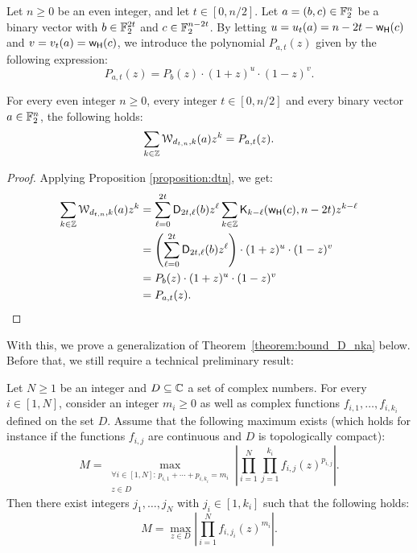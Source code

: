 \documentclass[11pt]{llncs}
\begin{document}
\begin{definition}\label{defi:P_a_t}
    Let $n\geq 0$ be an even integer, and let $t\in[0,n/2]$. Let $a=(b,c)\in\mathbb{F}_2^n$ be a binary vector with $b\in\mathbb{F}_2^{2t}$ and $c\in\mathbb{F}_2^{n-2t}$. By letting $u=u_t(a)=n-2t-\mathsf{w_H}(c)$ and $v=v_t(a)=\mathsf{w_H}(c)$, we introduce the polynomial $P_{a,t}(z)$ given by the following expression:
    \[
        P_{a,t}(z)=P_b(z)\cdot(1+z)^u\cdot(1-z)^v.
    \]
\end{definition}

\begin{proposition}
    For every even integer $n\geq 0$, every integer $t\in[0,n/2]$ and every binary vector $a\in\mathbb{F}_2^n$, the following holds:
    \[
        \sum_{k\in\mathbb{Z}}\mathcal{W}_{d_{t,n},k}(a)z^k=P_{a,t}(z).
    \]
\end{proposition}

\begin{proof}
    Applying Proposition \ref{proposition:dtn}, we get:
    \begin{align*}
        \sum_{k\in\mathbb{Z}}\mathcal{W}_{d_{t,n},k}(a)z^k&=\sum_{\ell=0}^{2t}\mathsf{D}_{2t,\ell}(b)z^\ell\sum_{k\in\mathbb{Z}}\mathsf{K}_{k-\ell}(\mathsf{w_H}(c),n-2t)z^{k-\ell}\\
        &=\left(\sum_{\ell=0}^{2t}\mathsf{D}_{2t,\ell}(b)z^\ell\right)\cdot(1+z)^u\cdot(1-z)^v\\
        &=P_b(z)\cdot(1+z)^u\cdot(1-z)^v\\
        &=P_{a,t}(z).\qedhere
    \end{align*}
\end{proof}

With this, we prove a generalization of Theorem~\ref{theorem:bound_D_nka} below. Before that, we still require a technical preliminary result:

\begin{lemma}\label{lemma:maximizing_args}
    Let $N\geq 1$ be an integer and $D\subseteq\mathbb{C}$ a set of complex numbers. For every $i\in[1,N]$, consider an integer $m_i\geq 0$ as well as complex functions $f_{i,1},\dots,f_{i,k_i}$ defined on the set $D$. Assume that the following maximum exists (which holds for instance if the functions $f_{i,j}$ are continuous and $D$ is topologically compact):
    \[
        M=\max_{\substack{\forall i\in[1,N]:\,p_{i,1}+\cdots+p_{i,k_i}=m_i\\z\in D}}\left|\prod_{i=1}^N\prod_{j=1}^{k_i}f_{i,j}(z)^{p_{i,j}}\right|.
    \]
    Then there exist integers $j_1,\dots,j_N$ with $j_i\in[1,k_i]$ such that the following holds:
    \[
        M=\max_{z\in D}\left|\prod_{i=1}^Nf_{i,j_i}(z)^{m_i}\right|.
    \]
\end{lemma}
\end{document}
